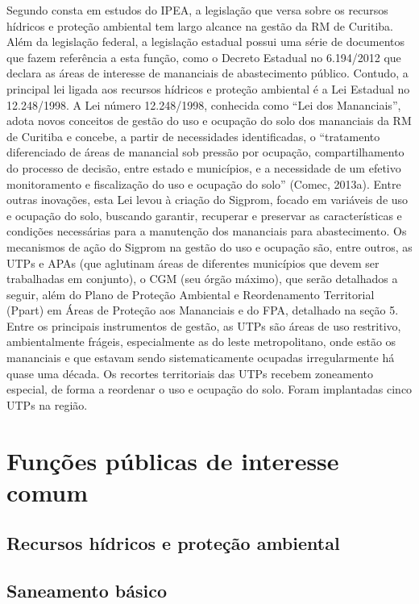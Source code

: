 	Segundo consta em estudos do IPEA, a legislação que versa sobre os recursos hídricos e proteção ambiental tem largo alcance na gestão da RM de Curitiba. Além da legislação federal, a legislação estadual possui uma série de documentos que fazem referência a esta função, como o Decreto Estadual no 6.194/2012 que declara as áreas de interesse de mananciais de abastecimento público. Contudo, a principal lei ligada aos recursos hídricos e proteção ambiental é a Lei Estadual no 12.248/1998. A Lei número 12.248/1998, conhecida como ``Lei dos Mananciais'', adota novos conceitos de gestão do uso e ocupação do solo dos mananciais da RM de Curitiba e concebe, a partir de necessidades identificadas, o ``tratamento diferenciado de áreas de manancial sob pressão por ocupação, compartilhamento do processo de decisão, entre estado e municípios, e a necessidade de um efetivo monitoramento e fiscalização do uso e ocupação do solo'' (Comec, 2013a). Entre outras inovações, esta Lei levou à criação do Sigprom, focado em variáveis de uso e ocupação do solo, buscando garantir, recuperar e preservar as características e condições necessárias para a manutenção dos mananciais para abastecimento. Os mecanismos de ação do Sigprom na gestão do uso e ocupação são, entre outros, as UTPs e APAs (que aglutinam áreas de diferentes municípios que devem ser trabalhadas em conjunto), o CGM (seu órgão máximo), que serão detalhados a seguir, além do Plano de Proteção Ambiental e Reordenamento Territorial (Ppart) em Áreas de Proteção aos Mananciais e do FPA, detalhado na seção 5. Entre os principais instrumentos de gestão, as UTPs são áreas de uso restritivo, ambientalmente frágeis, especialmente as do leste metropolitano, onde estão os mananciais e que estavam sendo sistematicamente ocupadas irregularmente há quase uma década. Os recortes territoriais das UTPs recebem zoneamento especial, de forma a reordenar o uso e ocupação do solo. Foram implantadas cinco UTPs na região.

	\chapter{Funções públicas de interesse comum}
	
	\section{Recursos hídricos e proteção ambiental}
	
	\section{Saneamento básico}
	
